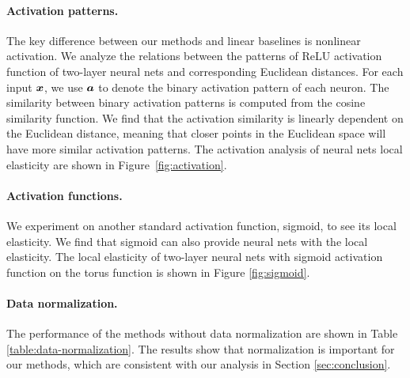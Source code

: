 \paragraph{Activation patterns.}
The key difference between our methods and linear baselines is nonlinear activation. We analyze the relations between the patterns of ReLU activation function of two-layer neural nets and corresponding Euclidean distances. For each input $\bm{x}$, we use $\bm{a}$ to denote the binary activation pattern of each neuron. The similarity between binary activation patterns is computed from the cosine similarity function. We find that the activation similarity is linearly dependent on the Euclidean distance, meaning that closer points in the Euclidean space will have more similar activation patterns. 
 The activation analysis of neural nets local elasticity are shown in Figure~\ref{fig:activation}.

\paragraph{Activation functions.}
We experiment on another standard activation function, sigmoid, to see its local elasticity. We find that sigmoid can also provide neural nets with the local elasticity.
The local elasticity of two-layer neural nets with sigmoid activation function on the torus function is shown in Figure \ref{fig:sigmoid}.

\paragraph{Data normalization.}
The performance of the methods without data normalization are shown in Table \ref{table:data-normalization}. The results show that normalization is important for our methods, which are consistent with our analysis in Section \ref{sec:conclusion}.


